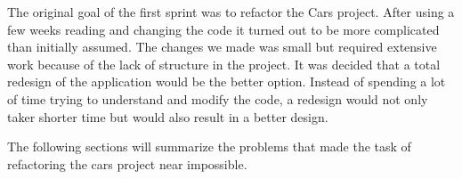 The original goal of the first sprint was to refactor the Cars project. 
After using a few weeks reading and changing the code it turned out to be more complicated than initially assumed.
The changes we made was small but required extensive work because of the lack of structure in the project.
It was decided that a total redesign of the application would be the better option.
Instead of spending a lot of time trying to understand and modify the code, a redesign would not only taker shorter time but would also result in a better design.

The following sections will summarize the problems that made the task of refactoring the cars project near impossible.